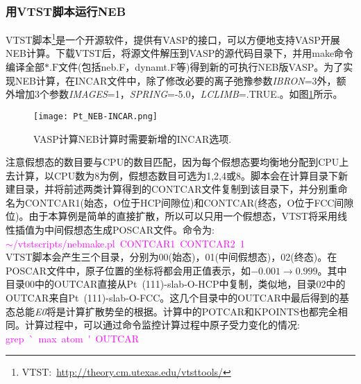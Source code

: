 \subsubsection{\rm{用VTST脚本运行NEB}}
\textrm{VTST}脚本\footnote{\textrm{VTST:~\url{http://theory.cm.utexas.edu/vtsttools/}}}是一个开源软件，提供有\textrm{VASP}的接口，可以方便地支持\textrm{VASP}开展\textrm{NEB}计算。下载\textrm{VTST}后，将源文件解压到\textrm{VASP}的源代码目录下，并用\textrm{make}命令编译全部$\ast.\mathrm{F}$文件(包括\textrm{neb.F}，\textrm{dynamt.F}等)得到新的可执行\textrm{NEB}版\textrm{VASP}。为了实现\textrm{NEB}计算，在\textrm{INCAR}文件中，除了修改必要的离子弛豫参数\textit{IBRON}=3外，额外增加3个参数\textit{IMAGES}=1，\textit{SPRING}=-5.0，\textit{LCLIMB}=\textrm{.TRUE.}。如图\ref{Pt_NEB-INCAR}所示。
\begin{figure}[h!]
\centering
\texttt{[image: Pt\_NEB-INCAR.png]}
\caption{\small \textrm{VASP}计算\textrm{NEB}计算时需要新增的\textrm{INCAR}选项.}%
\label{Pt_NEB-INCAR}
\end{figure}

注意假想态的数目要与\textrm{CPU}的数目匹配，因为每个假想态要均衡地分配到\textrm{CPU}上去计算，以\textrm{CPU}数为8为例，假想态数目可选为1,2,4或8。脚本会在计算目录下新建目录，并将前述两类计算得到的\textrm{CONTCAR}文件复制到该目录下，并分别重命名为\textrm{CONTCAR1}(始态，\textrm{O}位于\textrm{HCP}间隙位)和\textrm{CONTCAR}(终态，\textrm{O}位于\textrm{FCC}间隙位)。由于本算例是简单的直接扩散，所以可以只用一个假想态，\textrm{VTST}将采用线性插值为中间假想态生成\textrm{POSCAR}文件。命令为:~\\
\textcolor{magenta}{\textrm{$\sim$/vtstscripts/nebmake.pl~\textrm{CONTCAR1}~\textrm{CONTCAR2}~1}}\\
\textrm{VTST}脚本会产生三个目录，分别为00(始态)，01(中间假想态)，02(终态)。在\textrm{POSCAR}文件中，原子位置的坐标将都会用正值表示，如$-0.001\rightarrow0.999$。其中目录00中的\textrm{OUTCAR}直接从\textrm{Pt~(111)-slab-O-HCP}中复制，类似地，目录02中的\textrm{OUTCAR}来自\textrm{Pt~(111)-slab-O-FCC}。这几个目录中的\textrm{OUTCAR}中最后得到的基态总能\textit{E0}将是计算扩散势垒的根据。计算中的\textrm{POTCAR}和\textrm{KPOINTS}也都完全相同。计算过程中，可以通过命令监控计算过程中原子受力变化的情况:\\
\textcolor{magenta}{\textrm{grep~\`~max~atom~\'~OUTCAR}}\\

